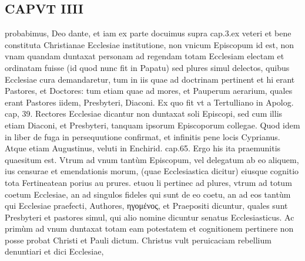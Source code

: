 \documentclass{article}
\begin{document}
\begin{pages}
\section*{CAPVT  IIII }
\marginpar{[ p.241 ]}\pstart probabimus, Deo dante, et iam ex parte docuimus supra cap.3.ex veteri et bene constituta Christianae Ecclesiae institutione, non vnicum Episcopum id est, non vnam quandam duntaxat personam ad regendam totam Ecclesiam electam et ordinatam fuisse (id quod nunc fit in Papatu) sed plures simul delectos, quibus Ecclesiae cura demandaretur, tum in iis quae ad doctrinam pertinent et hi erant Pastores, et Doctores: tum etiam quae ad mores, et Pauperum aerarium, quales erant Pastores iidem, Presbyteri, Diaconi. Ex quo fit vt a Tertulliano in Apolog. cap, 39. Rectores Ecclesiae dicantur non duntaxat soli Episcopi, sed cum illis etiam Diaconi, et Presbyteri, tanquam ipsorum Episcoporum collegae. Quod idem in liber  de fuga in persequutione confirmat, et infinitis pene locis Cyprianus. Atque etiam Augustinus, veluti in Enchirid. cap.65.  \pend\pstart Ergo his ita praemunitis quaesitum est. Vtrum ad vnum tantùm Episcopum, vel delegatum ab eo aliquem, ius censurae et emendationis morum, (quae Ecclesiastica dicitur) eiusque cognitio tota Fertineatean porius au prures. etuou li pertinec ad plures, vtrum ad totum coetum Ecclesiae, an ad singulos fideles qui sunt de eo coetu, an ad eos tantùm qui Ecclesiae praefecti, Authores, ηγομένος, et Praepositi dicuntur, quales sunt Presbyteri et pastores simul, qui alio nomine dicuntur senatus Ecclesiasticus.  \pend\pstart Ac primùm ad vnum duntaxat totam eam potestatem et cognitionem pertinere non posse probat Christi et Pauli dictum. Christus vult peruicaciam rebellium denuntiari et dici Ecclesiae,  \pend

\end{pages}
\end{document}
